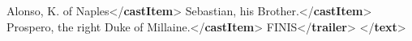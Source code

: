 \begin{shaded}
\hspace*{1em}\hspace*{1em}Alonso, K. of Naples{</\textbf{castItem}>}\mbox{}\newline 
\hspace*{1em}\hspace*{1em}Sebastian, his Brother.{</\textbf{castItem}>}\mbox{}\newline 
\hspace*{1em}\hspace*{1em}Prospero, the right Duke of Millaine.{</\textbf{castItem}>}\mbox{}\newline 
\hspace*{1em}\mbox{}\newline 
\hspace*{1em}FINIS{</\textbf{trailer}>}\mbox{}\newline 
{}\mbox{}\newline 
{</\textbf{text}>}\end{shaded}\egroup\par \noindent  \par
